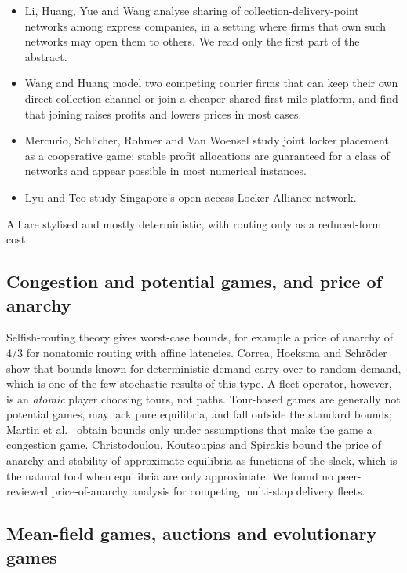\documentclass[preprint,12pt]{elsarticle}
\begin{document}
\begin{itemize}[leftmargin=*]
\item Li, Huang, Yue and Wang \cite{Li2024} analyse sharing of collection-delivery-point networks among express companies, in a setting where firms that own such networks may open them to others. We read only the first part of the abstract.
\item Wang and Huang \cite{WangHuang2021} model two competing courier firms that can keep their own direct collection channel or join a cheaper shared first-mile platform, and find that joining raises profits and lowers prices in most cases.
\item Mercurio, Schlicher, Rohmer and Van Woensel \cite{Mercurio2026} study joint locker placement as a cooperative game; stable profit allocations are guaranteed for a class of networks and appear possible in most numerical instances.
\item Lyu and Teo \cite{LyuTeo2022} study Singapore's open-access Locker Alliance network.
\end{itemize}
All are stylised and mostly deterministic, with routing only as a reduced-form cost.

\subsection{Congestion and potential games, and price of anarchy}\label{sec:poa}

Selfish-routing theory \cite{Wardrop1952,Rosenthal1973,Monderer1996,Roughgarden2002,Correa2004} gives worst-case bounds, for example a price of anarchy of $4/3$ for nonatomic routing with affine latencies. Correa, Hoeksma and Schr{\"o}der \cite{Correa2019} show that bounds known for deterministic demand carry over to random demand, which is one of the few stochastic results of this type. A fleet operator, however, is an \emph{atomic} player choosing tours, not paths. Tour-based games are generally not potential games, may lack pure equilibria, and fall outside the standard bounds; Martin et al.\ \cite{Martin2021} obtain bounds only under assumptions that make the game a congestion game. Christodoulou, Koutsoupias and Spirakis \cite{Christodoulou2011} bound the price of anarchy and stability of approximate equilibria as functions of the slack, which is the natural tool when equilibria are only approximate. We found no peer-reviewed price-of-anarchy analysis for competing multi-stop delivery fleets.

\subsection{Mean-field games, auctions and evolutionary games}
\end{document}
